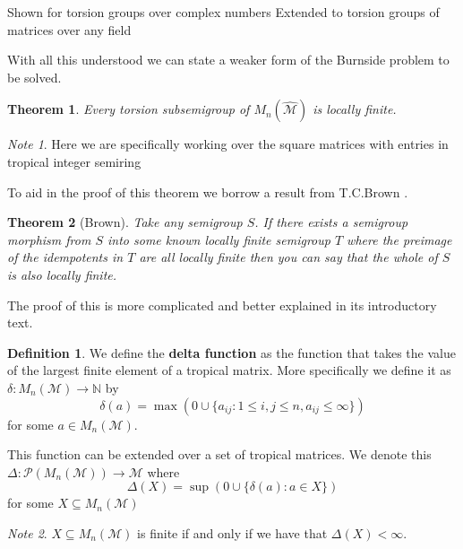 \documentclass[12pt,a4paper]{amsart}
\newcommand{\N}{\mathbb{N}}
\newcommand{\TM}{\mathcal{M}}
\newtheorem{thm}{Theorem}[section]
\theoremstyle{definition}
\newtheorem{defn}{Definition}[section]
\theoremstyle{remark}
\newtheorem*{note}{Note}
\begin{document}
Shown for torsion groups over complex numbers
Extended to torsion groups of matrices over any field


With all this understood we can state a weaker form of the Burnside problem to be solved.

\begin{thm}\label{thm:Simon1}
Every torsion subsemigroup of $M_n(\hat{\TM})$ is locally finite.
\end{thm}
\begin{note}
Here we are specifically working over the square matrices with entries in tropical integer semiring
\end{note}

To aid in the proof of this theorem we borrow a result from T.C.Brown \cite{brown1969locally}.

\begin{thm}[Brown]\label{thm:Brown}
Take any semigroup $S$. If there exists a semigroup morphism from $S$ into some known locally finite semigroup $T$ where the preimage of the idempotents in $T$ are all locally finite then you can say that the whole of $S$ is also locally finite.
\end{thm}

The proof of this is more complicated and better explained in its introductory text\cite{brown1969locally}.

\begin{defn}
We define the \textbf{delta function} as the function that takes the value of the largest finite element of a tropical matrix. More specifically we define it as $\delta:M_n(\TM)\to\N$ by
\begin{equation}
    \delta(a) = \max(0\cup\{ a_{ij} : 1\leq i,j \leq n, a_{ij}\leq\infty \})
\end{equation}
for some $a\in M_n(\TM)$.

This function can be extended over a set of tropical matrices. We denote this $\Delta:\mathcal{P}(M_n(\TM))\to\TM$ where
\begin{equation}
    \Delta(X) = \sup(0\cup\{ \delta(a) : a\in X \})
\end{equation}
for some $X\subseteq M_n(\TM)$
\end{defn}

\begin{note}
$X\subseteq M_n(\TM)$ is finite if and only if we have that $\Delta(X)<\infty$.
\end{note}
\end{document}
